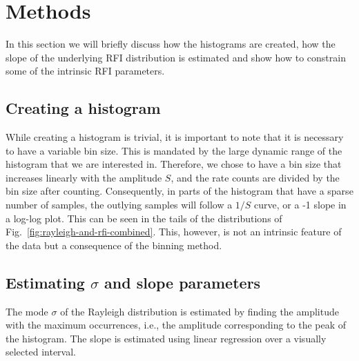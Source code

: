 \documentclass[useAMS,usenatbib]{mn2e}
\begin{document}
\section{Methods} \label{sec:distribution-methods}
In this section we will briefly discuss how the histograms are created, how the slope of the underlying RFI distribution is estimated and show how to constrain some of the intrinsic RFI parameters.

\subsection{Creating a histogram} \label{sec:histogram}
While creating a histogram is trivial, it is important to note that it is necessary to have a variable bin size. This is mandated by the large dynamic range of the histogram that we are interested in. Therefore, we chose to have a bin size that increases linearly with the amplitude $S$, and the rate counts are divided by the bin size after counting. Consequently, in parts of the histogram that have a sparse number of samples, the outlying samples will follow a $1/S$ curve, or a -1 slope in a log-log plot. This can be seen in the tails of the distributions of Fig.~\ref{fig:rayleigh-and-rfi-combined}. This, however, is not an intrinsic feature of the data but a consequence of the binning method.

\subsection{Estimating $\sigma$ and slope parameters}
The mode $\sigma$ of the Rayleigh distribution is estimated by finding the amplitude with the maximum occurrences, i.e., the amplitude corresponding to the peak of the histogram. The slope is estimated using linear regression over a visually selected interval.
\end{document}
